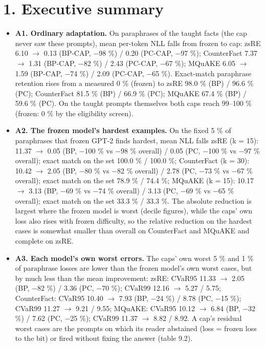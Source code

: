 \documentclass[10pt,a4paper]{article}
\begin{document}
\section*{1. Executive summary}



\begin{itemize}
\item \textbf{A1. Ordinary adaptation.} On paraphrases of the taught facts (the cap never saw these prompts), mean per-token NLL falls from frozen to cap: zsRE 6.10 $\to$ 0.13 (BP-CAP, $-$98 \%) / 0.20 (PC-CAP, $-$97 \%); CounterFact 7.37 $\to$ 1.31 (BP-CAP, $-$82 \%) / 2.43 (PC-CAP, $-$67 \%); MQuAKE 6.05 $\to$ 1.59 (BP-CAP, $-$74 \%) / 2.09 (PC-CAP, $-$65 \%). Exact-match paraphrase retention rises from a measured 0 \% (frozen) to zsRE 98.0 \% (BP) / 96.6 \% (PC); CounterFact 81.5 \% (BP) / 66.9 \% (PC); MQuAKE 67.4 \% (BP) / 59.6 \% (PC). On the taught prompts themselves both caps reach 99–100 \% (frozen: 0 \% by the eligibility screen).
\item \textbf{A2. The frozen model's hardest examples.} On the fixed 5 \% of paraphrases that frozen GPT-2 finds hardest, mean NLL falls zsRE (k = 15): 11.37 $\to$ 0.05 (BP, $-$100 \% vs $-$98 \% overall) / 0.05 (PC, $-$100 \% vs $-$97 \% overall); exact match on the set 100.0 \% / 100.0 \%; CounterFact (k = 30): 10.42 $\to$ 2.05 (BP, $-$80 \% vs $-$82 \% overall) / 2.78 (PC, $-$73 \% vs $-$67 \% overall); exact match on the set 78.9 \% / 74.4 \%; MQuAKE (k = 15): 10.17 $\to$ 3.13 (BP, $-$69 \% vs $-$74 \% overall) / 3.13 (PC, $-$69 \% vs $-$65 \% overall); exact match on the set 33.3 \% / 33.3 \%. The absolute reduction is largest where the frozen model is worst (decile figures), while the caps' own loss also rises with frozen difficulty, so the relative reduction on the hardest cases is somewhat smaller than overall on CounterFact and MQuAKE and complete on zsRE.
\item \textbf{A3. Each model's own worst errors.} The caps' own worst 5 \% and 1 \% of paraphrase losses are lower than the frozen model's own worst cases, but by much less than the mean improvement: zsRE: CVaR95 11.33 $\to$ 2.05 (BP, $-$82 \%) / 3.36 (PC, $-$70 \%); CVaR99 12.16 $\to$ 5.27 / 5.75; CounterFact: CVaR95 10.40 $\to$ 7.93 (BP, $-$24 \%) / 8.78 (PC, $-$15 \%); CVaR99 11.27 $\to$ 9.21 / 9.55; MQuAKE: CVaR95 10.12 $\to$ 6.84 (BP, $-$32 \%) / 7.62 (PC, $-$25 \%); CVaR99 11.37 $\to$ 8.82 / 8.92. A cap's residual worst cases are the prompts on which its reader abstained (loss = frozen loss to the bit) or fired without fixing the answer (table 9.2).

\end{itemize}
\end{document}
